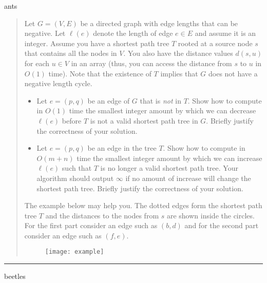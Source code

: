 \documentclass[11pt]{article}
\begin{document}
\begin{solution}
    ants
\end{solution}


\begin{quote}
Let $G=(V,E)$ be a directed graph with edge lengths that can be
  negative. Let $\ell(e)$ denote the length of edge $e \in E$ and
  assume it is an integer. Assume you have a shortest path tree $T$
  rooted at a source node $s$ that contains all the nodes in $V$. You
  also have the distance values $d(s,u)$ for each $u \in V$ in an
  array (thus, you can access the distance from $s$ to $u$ in $O(1)$
  time). Note that the existence of $T$ implies that $G$ does not have
  a negative length cycle. 
  \begin{itemize}
  \item  Let $e=(p,q)$ be an edge of $G$ that is {\em not} in
    $T$. Show how to compute in $O(1)$ time the smallest
    integer amount by which we can decrease $\ell(e)$ before $T$
    is not a valid shortest path tree in $G$. Briefly justify the correctness of your solution.
  \item Let $e=(p,q)$ be an edge in the tree $T$. Show how to
  compute in $O(m+n)$ time the smallest integer amount by which we can 
  increase $\ell(e)$ such that $T$ is no longer a valid shortest path tree. 
  Your algorithm should output $\infty$ if no amount of increase will
  change the shortest path tree. Briefly justify the correctness of your solution.
  \end{itemize}
  The example below may help you. The dotted 
 edges form the shortest path tree $T$ and the distances to the nodes
  from $s$ are shown inside the circles. For the first part consider
  an edge such as $(b,d)$ and for the second part consider an edge
  such as $(f,e)$.
\begin{figure}[h]
  \centering
  \texttt{[image: example]}
\end{figure}
\end{quote}
\hrule



\begin{solution}
    beetles
\end{solution}

\end{document}
